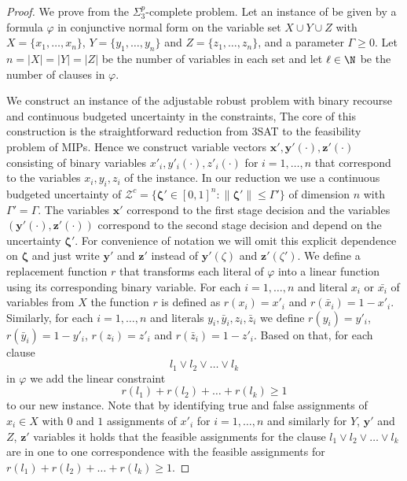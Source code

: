 \documentclass[a4paper,abstracton]{scrartcl}
\begin{document}
\begin{proof}
    We prove  from the $\Sigma_3^p$-complete
    {\radj} problem. 
    Let an instance of {\radj} be given by a formula $\varphi$ in conjunctive normal form 
    on the variable set $X \cup Y \cup Z$ with $X=\{x_1, \dots, x_n\}$, $Y=\{y_1,\dots,y_n\}$ and $Z=\{z_1,\dots,z_n\}$,
    and a parameter $\Gamma \geq 0$. 
    Let $n = |X| = |Y| = |Z|$ be the number of variables in each set and let $\ell \in \N$ be the number of clauses in $\varphi$. 
    
    We construct an instance of the adjustable robust problem with binary recourse and continuous budgeted uncertainty
    in the constraints, 
    The core of this construction is the straightforward reduction from 3SAT to the feasibility problem of MIPs.
    Hence we construct variable vectors $\pmb{x}', \pmb{y}'(\cdot), \pmb{z}'(\cdot)$ consisting of binary variables $x'_i, y'_i(\cdot), z'_i(\cdot)$ for 
    $i=1,\dots,n$ that correspond to the variables $x_i,y_i,z_i$ of the {\radj} instance.
    In our reduction we use a continuous budgeted uncertainty of $\mathcal{Z}^c = \{\pmb{\zeta}' \in [0,1]^n \colon \| \pmb{\zeta}' \| \leq \Gamma'\}$ of dimension $n$ with $\Gamma' = \Gamma$.
    The variables $\pmb{x}'$ correspond to the first stage decision and the variables $(\pmb{y}'(\cdot), \pmb{z}'(\cdot))$
    correspond to the second stage decision and depend on the uncertainty $\pmb{\zeta}'$.
    For convenience of notation we will omit this explicit dependence on $\pmb{\zeta}$ and just write $\pmb{y}'$ and $\pmb{z}'$ instead of $\pmb{y}'(\zeta)$ and $\pmb{z}'(\zeta')$.
    We define a replacement function $r$ that transforms each literal of $\varphi$ into a linear function using its corresponding binary variable.
    For each $i=1,\dots,n$ and literal $x_i$ or $\bar{x_i}$ of variables from $X$ the function $r$ is defined as 
    $r(x_i) = x'_i$ and $r(\bar{x}_i) = 1-x'_i$.
    Similarly, for each $i=1,\dots,n$ and literals $y_i, \bar{y}_i, z_i, \bar{z}_i$ we define 
    $r(y_i) = y'_i$, $r(\bar{y}_i) = 1-y'_i$, $r(z_i) = z'_i$ and $r(\bar{z}_i) = 1-z'_i$.
    Based on that, for each clause 
    \[ l_1 \lor l_2 \lor \dots \lor l_k \]
    in $\varphi$ we add the linear constraint
    \[ r(l_1) + r(l_2) + \dots + r(l_k) \geq 1 \] 
    to our new instance. Note that by identifying true and false assignments of $x_i \in X$ with $0$ and $1$ 
    assignments of $x'_i$ for $i=1,\dots,n$ and similarly for $Y$, $\pmb{y}'$ and $Z$, $\pmb{z}'$ variables 
    it holds that the feasible assignments for the clause $l_1 \lor l_2 \lor \dots \lor l_k$ are in one to one 
    correspondence with the feasible assignments for $r(l_1) + r(l_2) + \dots + r(l_k) \geq 1$.


\end{proof}
\end{document}
